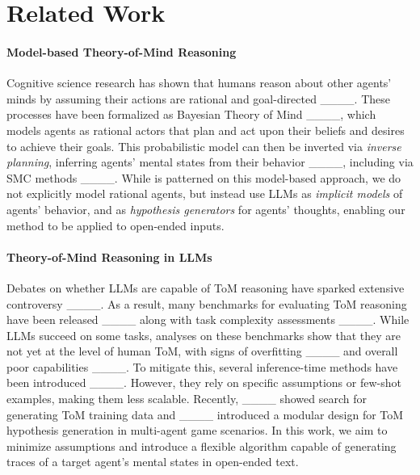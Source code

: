 \section{Related Work}
\paragraph{Model-based Theory-of-Mind Reasoning}
Cognitive science research has shown that humans reason about other agents' minds by assuming their actions are rational and goal-directed ____. These processes have been formalized as Bayesian Theory of Mind ____, which models agents as rational actors that plan and act upon their beliefs and desires to achieve their goals. This probabilistic model can then be inverted via \textit{inverse planning}, inferring agents' mental states from their behavior ____, including via SMC methods ____. While \tracing is patterned on this model-based approach, we do not explicitly model rational agents, but instead use LLMs as \emph{implicit models} of agents' behavior, and as \emph{hypothesis generators} for agents' thoughts, enabling our method to be applied to open-ended inputs.

\paragraph{Theory-of-Mind Reasoning in LLMs}
Debates on whether LLMs are capable of ToM reasoning have sparked extensive controversy ____.
As a result, many benchmarks for evaluating ToM reasoning have been released ____ along with task complexity assessments ____.
While LLMs succeed on some tasks, analyses on these benchmarks show that they are not yet at the level of human ToM, with signs of overfitting ____ and overall poor capabilities ____.
To mitigate this, several inference-time methods have been introduced ____.
However, they rely on specific assumptions or few-shot examples, making them less scalable.
Recently, ____ showed search for generating ToM training data and ____ introduced a modular design for ToM hypothesis generation in multi-agent game scenarios.
In this work, we aim to minimize assumptions and introduce a flexible algorithm capable of generating traces of a target agent's mental states in open-ended text.


